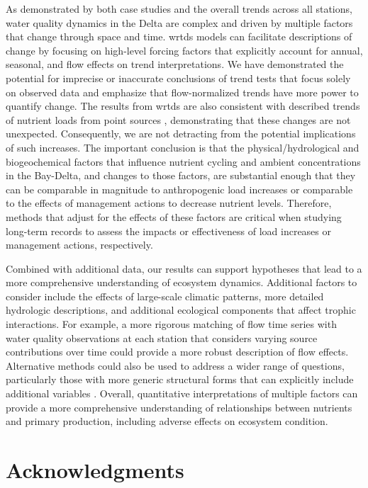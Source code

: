 \documentclass[letterpaper,12pt,oneside]{article}\usepackage[]{graphicx}\usepackage[]{color}
\begin{document}
As demonstrated by both case studies and the overall trends across all stations, water quality dynamics in the Delta are complex and driven by multiple factors that change through space and time. \ac{wrtds} models can facilitate descriptions of change by focusing on high-level forcing factors that explicitly account for annual, seasonal, and flow effects on trend interpretations.  We have demonstrated the potential for imprecise or inaccurate conclusions of trend tests that focus solely on observed data and emphasize that flow-normalized trends have more power to quantify change.  The results from \ac{wrtds} are also consistent with described trends of nutrient loads from point sources \citep[e.g., Sacramento \ac{wwtp} increases and exports to Suisun Bay,][]{Jassby08,Novick14}, demonstrating that these changes are not unexpected.  Consequently, we are not detracting from the potential implications of such increases. The important conclusion is that the physical/hydrological and biogeochemical factors that influence nutrient cycling and ambient concentrations in the Bay-Delta, and changes to those factors, are substantial enough that they can be comparable in magnitude to anthropogenic load increases or comparable to the effects of management actions to decrease nutrient levels. Therefore, methods that adjust for the effects of these factors are critical when studying long-term records to assess the impacts or effectiveness of load increases or management actions, respectively.

Combined with additional data, our results can support hypotheses that lead to a more comprehensive understanding of ecosystem dynamics. Additional factors to consider include the effects of large-scale climatic patterns, more detailed hydrologic descriptions, and additional ecological components that affect trophic interactions.  For example, a more rigorous matching of flow time series with water quality observations at each station that considers varying source contributions over time could provide a more robust description of flow effects.  Alternative methods could also be used to address a wider range of questions, particularly those with more generic structural forms that can explicitly include additional variables \citep[e.g., generalized additive models,][]{Beck17}.  Overall, quantitative interpretations of multiple factors can provide a more comprehensive understanding of relationships between nutrients and primary production, including adverse effects on ecosystem condition.

\section*{Acknowledgments}
\end{document}
